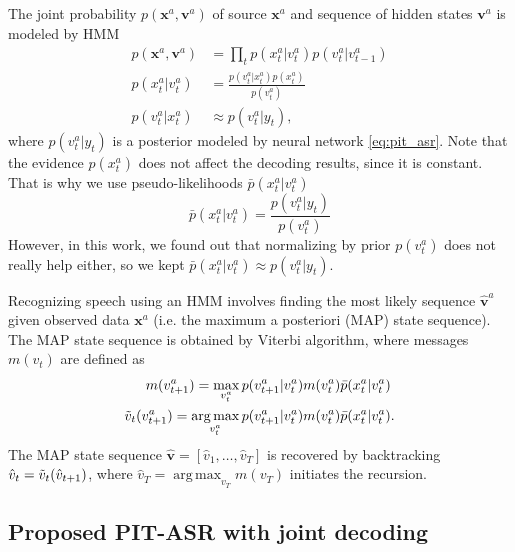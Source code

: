 \documentclass[a4paper]{article}
\newcommand{\spkrA}{a}
\def\x{{\mathbf x}}
\def\w{{\mathbf v}}
\def\p{{\bar p}}
\DeclareMathOperator*{\argmax}{arg\,max}
\begin{document}
The joint probability $p(\x^\spkrA, \w^\spkrA)$ of source $\x^\spkrA$ and sequence of hidden states $\w^\spkrA$ is modeled by HMM
\begin{align}
    p(\x^\spkrA, \w^\spkrA) &= \prod_t p(x_t^\spkrA | v_t^\spkrA) p(v_t^\spkrA | v_{t-1}^\spkrA)\\
    p(x^\spkrA_t | v^\spkrA_t) &= \frac{p(v^\spkrA_t|x^\spkrA_t) p(x_t^\spkrA)}{p(v^\spkrA_t)}\\
    p(v^\spkrA_t|x^\spkrA_t) &\approx p(v^\spkrA_t|y_t),
\end{align}
where $p(v^\spkrA_t|y_t)$ is a posterior modeled by neural network \eqref{eq:pit_asr}.
Note that the evidence $p(x_t^a)$ does not affect the decoding results, since it is constant. That is why we use pseudo-likelihoods $\p(x^\spkrA_t | v^\spkrA_t)$
\begin{equation}
    \p(x^\spkrA_t | v^\spkrA_t) = \frac{p(v^\spkrA_t|y_t)}{ p(v_t^\spkrA)}
\end{equation}
However, in this work, we found out that normalizing by
prior $p(v_t^\spkrA)$  does not really help either, so we kept $\p(x^\spkrA_t | v^\spkrA_t) \approx p(v^\spkrA_t|y_t)$.

Recognizing speech using an HMM involves finding the most likely sequence $\hat{\w}^\spkrA$ given observed data $\x^\spkrA$ (i.e. the maximum a posteriori (MAP) state sequence). The MAP state sequence is obtained by Viterbi algorithm, where messages $m(v_t)$ are defined as
\begin{align}
    m(v_{t+1}^\spkrA) = \max_{v_t^\spkrA}\, & p(v_{t+1}^\spkrA|v_t^\spkrA) m(v_t^\spkrA) \p(x_t^\spkrA|v_t^\spkrA)\\
    \Tilde{v}_t(v_{t+1}^\spkrA) = \argmax_{v_t^\spkrA}\,& p(v_{t+1}^\spkrA|v_t^\spkrA) m(v_t^\spkrA) \p(x_t^\spkrA|v_t^\spkrA).
\end{align}
The MAP state sequence $\hat{\w}  = [\hat{v}_1, \dots, \hat{v}_T]$ is recovered by backtracking $\hat{v}_t = \Tilde{v}_t(\hat{v}_{t+1})$, where $\hat{v}_T = \argmax_{v_T} m(v_T)$ initiates the recursion.

\subsection{Proposed PIT-ASR with joint decoding}
\label{sec:joint_asr}
\end{document}
